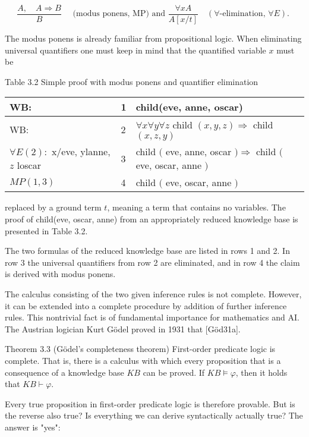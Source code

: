 \documentclass[10pt]{article}
\begin{document}
$$
\frac{A, \quad A \Rightarrow B}{B} \quad \text { (modus ponens, MP) and } \frac{\forall x A}{A[x / t]} \quad(\forall \text {-elimination, } \forall E) \text {. }
$$

The modus ponens is already familiar from propositional logic. When eliminating universal quantifiers one must keep in mind that the quantified variable $x$ must be

Table 3.2 Simple proof with modus ponens and quantifier elimination

\begin{center}
\begin{tabular}{lll}
\hline
WB: & 1 & child(eve, anne, oscar) \\
\hline
WB: & 2 & $\forall x \forall y \forall z$ child $(x, y, z) \Rightarrow$ child $(x, z, y)$ \\
\hline
$\forall E(2):$ x/eve, ylanne,$z$ loscar & 3 & child $($ eve, anne, oscar $) \Rightarrow$ child $($ eve, oscar, anne $)$ \\
\hline
$M P(1,3)$ & 4 & child $($ eve, oscar, anne $)$ \\
\hline
\end{tabular}
\end{center}

replaced by a ground term $t$, meaning a term that contains no variables. The proof of child(eve, oscar, anne) from an appropriately reduced knowledge base is presented in Table 3.2.

The two formulas of the reduced knowledge base are listed in rows 1 and 2. In row 3 the universal quantifiers from row 2 are eliminated, and in row 4 the claim is derived with modus ponens.

The calculus consisting of the two given inference rules is not complete. However, it can be extended into a complete procedure by addition of further inference rules. This nontrivial fact is of fundamental importance for mathematics and AI. The Austrian logician Kurt Gödel proved in 1931 that [Göd31a].

Theorem 3.3 (Gödel's completeness theorem) First-order predicate logic is complete. That is, there is a calculus with which every proposition that is a consequence of a knowledge base $K B$ can be proved. If $K B \models \varphi$, then it holds that $K B \vdash \varphi$.

Every true proposition in first-order predicate logic is therefore provable. But is the reverse also true? Is everything we can derive syntactically actually true? The answer is "yes":
\end{document}
